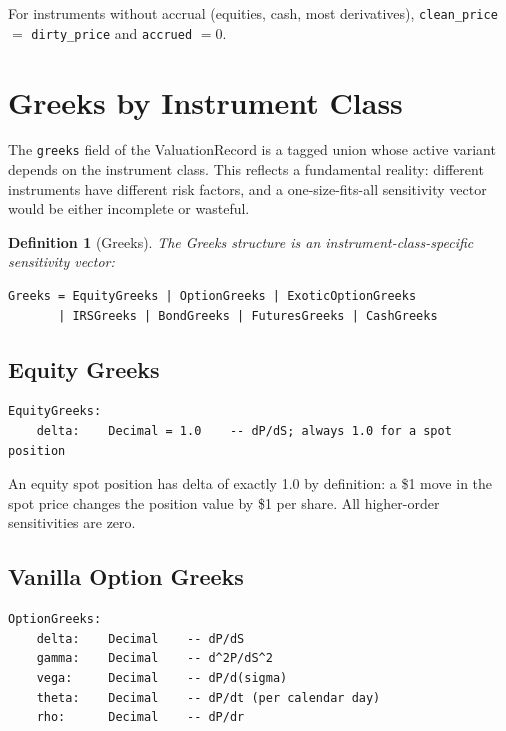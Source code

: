 \documentclass[11pt,a4paper]{article}
\newtheorem{definition}{Definition}[section]
\begin{document}
For instruments without accrual (equities, cash, most derivatives), \texttt{clean\_price} $=$ \texttt{dirty\_price} and \texttt{accrued} $= 0$.

\clearpage
\section{Greeks by Instrument Class}
\label{sec:greeks}

The \texttt{greeks} field of the ValuationRecord is a tagged union whose active variant depends on the instrument class.  This reflects a fundamental reality: different instruments have different risk factors, and a one-size-fits-all sensitivity vector would be either incomplete or wasteful.

\begin{definition}[Greeks]
\label{def:greeks}
The Greeks structure is an instrument-class-specific sensitivity vector:
\begin{lstlisting}
Greeks = EquityGreeks | OptionGreeks | ExoticOptionGreeks
       | IRSGreeks | BondGreeks | FuturesGreeks | CashGreeks
\end{lstlisting}
\end{definition}

\subsection{Equity Greeks}

\begin{lstlisting}
EquityGreeks:
    delta:    Decimal = 1.0    -- dP/dS; always 1.0 for a spot position
\end{lstlisting}

\noindent An equity spot position has delta of exactly 1.0 by definition: a \$1 move in the spot price changes the position value by \$1 per share.  All higher-order sensitivities are zero.

\subsection{Vanilla Option Greeks}

\begin{lstlisting}
OptionGreeks:
    delta:    Decimal    -- dP/dS
    gamma:    Decimal    -- d^2P/dS^2
    vega:     Decimal    -- dP/d(sigma)
    theta:    Decimal    -- dP/dt (per calendar day)
    rho:      Decimal    -- dP/dr
\end{lstlisting}
\end{document}
